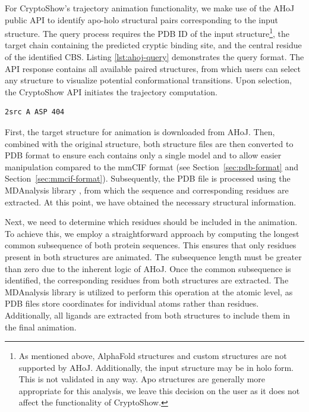 For CryptoShow's trajectory animation functionality, we make use of the AHoJ public API to identify apo-holo structural pairs corresponding to the input structure. The query process requires the PDB ID of the input structure\footnote{As mentioned above, AlphaFold structures and custom structures are not supported by AHoJ. Additionally, the input structure may be in holo form. This is not validated in any way. Apo structures are generally more appropriate for this analysis, we leave this decision on the user as it does not affect the functionality of CryptoShow.}, the target chain containing the predicted cryptic binding site, and the central residue of the identified CBS. Listing \ref{lst:ahoj-query} demonstrates the query format. The API response contains all available paired structures, from which users can select any structure to visualize potential conformational transitions. Upon selection, the CryptoShow API initiates the trajectory computation.

\begin{lstlisting}[caption={Sample query format for the AHoJ tool, specifying PDB ID 2src, chain A, aspartic acid residue at position 404}, label={lst:ahoj-query}]
    2src A ASP 404
\end{lstlisting}

First, the target structure for animation is downloaded from AHoJ. Then, combined with the original structure, both structure files are then converted to PDB format to ensure each contains only a single model and to allow easier manipulation compared to the mmCIF format (see Section~\ref{sec:pdb-format} and Section~\ref{sec:mmcif-format}). Subsequently, the PDB file is processed using the MDAnalysis library \cite{gowers2019mdanalysis}, from which the sequence and corresponding residues are extracted. At this point, we have obtained the necessary structural information.

Next, we need to determine which residues should be included in the animation. To achieve this, we employ a straightforward approach by computing the longest common subsequence of both protein sequences. This ensures that only residues present in both structures are animated. The subsequence length must be greater than zero due to the inherent logic of AHoJ. Once the common subsequence is identified, the corresponding residues from both structures are extracted. The MDAnalysis library is utilized to perform this operation at the atomic level, as PDB files store coordinates for individual atoms rather than residues. Additionally, all ligands are extracted from both structures to include them in the final animation.

